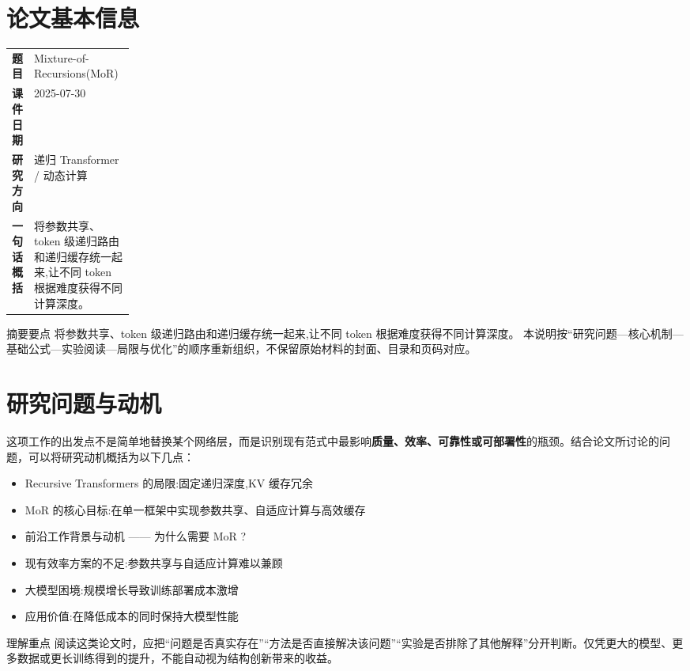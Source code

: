 \documentclass[UTF8,11pt,a4paper]{ctexart}
\newcommand{\term}[1]{\textbf{\textcolor{mainblue}{#1}}}
\begin{document}
\section{论文基本信息}
\begin{center}
\begin{tabularx}{0.94\linewidth}{>{\bfseries}p{0.18\linewidth}X}
\toprule
题目 & Mixture-of-Recursions(MoR)\\
课件日期 & 2025-07-30\\
研究方向 & 递归 Transformer / 动态计算\\
一句话概括 & 将参数共享、token 级递归路由和递归缓存统一起来,让不同 token 根据难度获得不同计算深度。\\
\bottomrule
\end{tabularx}
\end{center}

\begin{infobox}{摘要要点}
将参数共享、token 级递归路由和递归缓存统一起来,让不同 token 根据难度获得不同计算深度。 本说明按“研究问题—核心机制—基础公式—实验阅读—局限与优化”的顺序重新组织，不保留原始材料的封面、目录和页码对应。
\end{infobox}

\section{研究问题与动机}
这项工作的出发点不是简单地替换某个网络层，而是识别现有范式中最影响\term{质量、效率、可靠性或可部署性}的瓶颈。结合论文所讨论的问题，可以将研究动机概括为以下几点：
\begin{itemize}
\item Recursive Transformers 的局限:固定递归深度,KV 缓存冗余
\item MoR 的核心目标:在单一框架中实现参数共享、自适应计算与高效缓存
\item 前沿工作背景与动机 —— 为什么需要 MoR ?
\item 现有效率方案的不足:参数共享与自适应计算难以兼顾
\item 大模型困境:规模增长导致训练部署成本激增
\item 应用价值:在降低成本的同时保持大模型性能
\end{itemize}

\begin{notebox}{理解重点}
阅读这类论文时，应把“问题是否真实存在”“方法是否直接解决该问题”“实验是否排除了其他解释”分开判断。仅凭更大的模型、更多数据或更长训练得到的提升，不能自动视为结构创新带来的收益。
\end{notebox}
\end{document}
